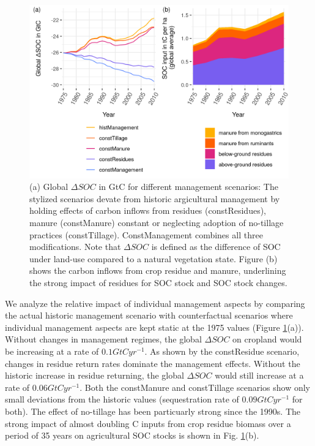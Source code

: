 \documentclass[gc, manuscript]{copernicus}
\begin{document}
\begin{figure}[h]
\includegraphics[width=14cm]{../ResultNotebooks/Output/Images/scenario_horiz} \caption{(a) Global $\Delta SOC$ in GtC for different management scenarios: The stylized scenarios devate from historic argicultural management by holding effects of carbon inflows from residues (constResidues), manure (constManure) constant or neglecting adoption of no-tillage practices (constTillage). ConstManagement combines all three modifications. Note that $\Delta SOC$ is defined as the difference of SOC under land-use compared to a natural vegetation state. Figure (b) shows the carbon inflows from crop residue and manure, underlining the strong impact of residues for SOC stock and SOC stock changes.}\label{fig:SOCscen}
\end{figure}

We analyze the relative impact of individual management aspects by comparing the actual historic management scenario with counterfactual scenarios where individual management aspects are kept static at the 1975 values (Figure \ref{fig:SOCscen}(a)). Without changes in management regimes, the global \(\Delta SOC\) on cropland would be increasing at a rate of \(0.1\unit{GtC yr^{-1}}\). As shown by the constResidue scenario, changes in residue return rates dominate the management effects. Without the historic increase in residue returning, the global \(\Delta SOC\) would still increase at a rate of \(0.06\unit{GtC yr^{-1}}\). Both the constManure and constTillage scenarios show only small deviations from the historic values (sequestration rate of \(0.09\unit{GtC yr^{-1}}\) for both). The effect of no-tillage has been particuarly strong since the 1990s.
The strong impact of almost doubling C inputs from crop residue biomass over a period of 35 years on agricultural SOC stocks is shown in Fig. \ref{fig:SOCscen}(b).
\end{document}
